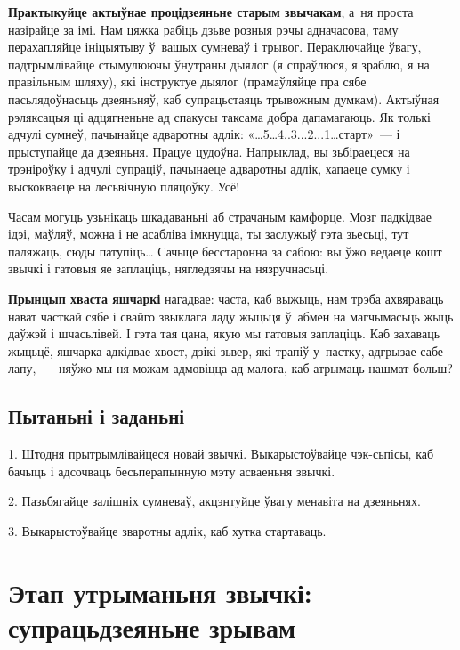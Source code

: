 \textbf{Практыкуйце актыўнае процідзеяньне старым звычакам}, а~ня проста назірайце за імі. Нам цяжка рабіць дзьве розныя рэчы адначасова, таму перахапляйце ініцыятыву ў~вашых сумневаў і трывог. Пераключайце ўвагу, падтрымлівайце стымулюючы ўнутраны дыялог (я спраўлюся, я зраблю, я на правільным шляху), які інструктуе дыялог (прамаўляйце пра сябе пасьлядоўнасьць дзеяньняў, каб супрацьстаяць трывожным думкам). Актыўная рэляксацыя ці адцягненьне ад спакусы таксама добра дапамагаюць. Як толькі адчулі сумнеў, пачынайце адваротны адлік: «…5…4..3...2...1…старт»~--- і прыступайце да дзеяньня. Працуе цудоўна. Напрыклад, вы зьбіраецеся на трэніроўку і адчулі супраціў, пачынаеце адваротны адлік, хапаеце сумку і выскокваеце на лесьвічную пляцоўку. Усё!


Часам могуць узьнікаць шкадаваньні аб страчаным камфорце. Мозг падкідвае ідэі, маўляў, можна і не асабліва імкнуцца, ты заслужыў гэта зьесьці, тут паляжаць, сюды патупіць… Сачыце бесстаронна за сабою: вы ўжо ведаеце кошт звычкі і гатовыя яе заплаціць, нягледзячы на нязручнасьці.

\textbf{Прынцып хваста яшчаркі} нагадвае: часта, каб выжыць, нам трэба ахвяраваць нават часткай сябе і свайго звыклага ладу жыцьця ў~абмен на магчымасьць жыць даўжэй і шчасьлівей. І гэта тая цана, якую мы гатовыя заплаціць. Каб захаваць жыцьцё, яшчарка адкідвае хвост, дзікі зьвер, які трапіў у~пастку, адгрызае сабе лапу,~--- няўжо мы ня можам адмовіцца ад малога, каб атрымаць нашмат больш?

\subsection*{Пытаньні і заданьні}

1. Штодня прытрымлівайцеся новай звычкі. Выкарыстоўвайце чэк-сьпісы, каб бачыць і адсочваць бесьперапынную мэту асваеньня звычкі.

2. Пазьбягайце залішніх сумневаў, акцэнтуйце ўвагу менавіта на дзеяньнях.

3. Выкарыстоўвайце зваротны адлік, каб хутка стартаваць.


\section{Этап утрыманьня звычкі: супрацьдзеяньне зрывам}

